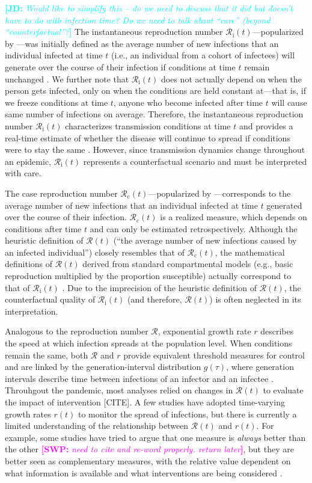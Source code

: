 \documentclass[12pt]{article}
\newcommand{\comment}{\showcomment}
\newcommand{\showcomment}[3]{\textcolor{#1}{\textbf{[#2: }\textsl{#3}\textbf{]}}}
\newcommand{\jd}[1]{\comment{cyan}{JD}{#1}}
\newcommand{\swp}[1]{\comment{magenta}{SWP}{#1}}
\newcommand{\Rx}[1]{\ensuremath{{\mathcal R}_{#1}}\xspace}
\newcommand{\Rc}{\Rx{\mathrm{c}}}
\newcommand{\Ri}{\Rx{\mathrm{i}}}
\newcommand{\RR}{\ensuremath{{\mathcal R}}\xspace}
\begin{document}
\jd{Would like to simplify this -- do we need to discuss that it did but doesn't have to do with infection time? Do we need to talk about “care” (beyond “counterfactual”?}
The instantaneous reproduction number $\Ri(t)$---popularized by \cite{cori2013new}---was initially defined as the average number of new infections that an individual infected at time $t$ (i.e., an individual from a cohort of infectees) will generate over the course of their infection if conditions at time $t$ remain unchanged \citep{fraser2007estimating}. 
We further note that $\Ri(t)$ does not actually depend on when the person gets infected, only on when the conditions are held constant at---that is, if we freeze conditions at time $t$, anyone who become infected after time $t$ will cause same number of infections on average.
Therefore, the instantaneous reproduction number $\Ri(t)$ characterizes transmission conditions at time $t$ and provides a real-time estimate of whether the disease will continue to spread if conditions were to stay the same \citep{gostic2020practical}.
However, since transmission dynamics change throughout an epidemic, $\Ri(t)$ represents a counterfactual scenario and must be interpreted with care.

The case reproduction number $\Rc(t)$---popularized by \cite{wallinga2004different}---corresponds to the average number of new infections that an individual infected at time $t$ generated over the course of their infection.
$\Rc(t)$ is a realized measure, which depends on conditions after time $t$ and can only be estimated retrospectively.
Although the heuristic definition of $\RR(t)$ (``the average number of new infections caused by an infected individual'') closely resembles that of $\Rc(t)$, the mathematical definitions of $\RR(t)$ derived from standard compartmental models (e.g., basic reproduction multiplied by the proportion susceptible) actually correspond to that of $\Ri(t)$ \citep{gostic2020practical}.
Due to the imprecision of the heuristic definition of $\RR(t)$, the counterfactual quality of $\Ri(t)$ (and therefore, $\RR(t)$) is often neglected in its interpretation.

Analogous to the reproduction number $\RR$, exponential growth rate $r$ describes the speed at which infection spreads at the population level.
When conditions remain the same, both $\RR$ and $r$ provide equivalent threshold measures for control and are linked by the generation-interval distribution $g(\tau)$, where generation intervals describe time between infections of an infector and an infectee \citep{svensson2007note}.
Throuhgout the pandemic, most analyses relied on changes in $\RR(t)$ to evaluate the impact of intervention [CITE].
A few studies have adopted time-varying growth rates $r(t)$ to monitor the spread of infections, but there is currently a limited understanding of the relationship between $\RR(t)$ and $r(t)$.
For example, some studies have tried to argue that one measure is \emph{always} better than the other  \swp{need to cite and re-word properly. return later}, but they are better seen as complementary measures, with the relative value dependent on what information is available and what interventions are being considered \cite{dushoff2021speed}.
\end{document}
